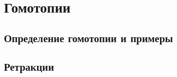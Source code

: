 \section{Гомотопии}
\begin{Intro}
        
\end{Intro}

\subsection{Определение гомотопии и примеры}
\subsection{Ретракции}
